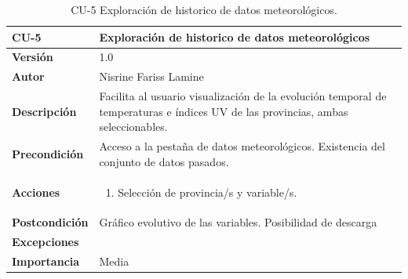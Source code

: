 \begin{table}[H]
	\centering
	\begin{tabularx}{\linewidth}{ p{} p{} }
		\toprule
		\textbf{CU-5}    & \textbf{Exploración de historico de datos meteorológicos}\\
		\toprule
		\textbf{Versión}              & 1.0    \\
		\textbf{Autor}                & Nisrine Fariss Lamine \\
		
		\textbf{Descripción}          & Facilita al usuario visualización de la evolución temporal de temperaturas e índices UV de las provincias, ambas seleccionables. \\
		\textbf{Precondición}         & Acceso a la pestaña de datos meteorológicos. Existencia del conjunto de datos pasados. \\
		\textbf{Acciones}             &
		\begin{enumerate}
			\def\labelenumi{\arabic{enumi}.}
			\tightlist
			\item Selección de provincia/s y variable/s.
		\end{enumerate}\\
		\textbf{Postcondición}        & Gráfico evolutivo de las variables. Posibilidad de descarga \\
		\textbf{Excepciones}          &  \\
		\textbf{Importancia}          & Media \\
		\bottomrule
	\end{tabularx}
	\caption{CU-5 Exploración de historico de datos meteorológicos.}
    \label{fig:cu5}

    \end{table}


   